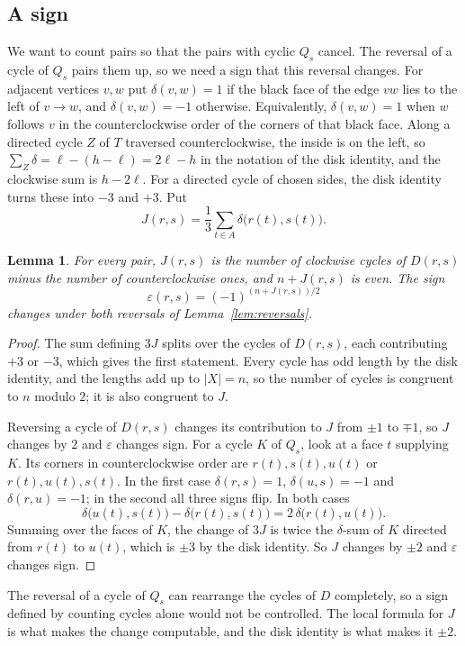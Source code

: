 \documentclass[10pt]{amsart}
\numberwithin{equation}{section}
\newtheorem{lemma}[equation]{Lemma}
\theoremstyle{definition}
\theoremstyle{remark}
\newcommand{\T}{T}
\newcommand{\eps}{\varepsilon}
\newcommand{\Dc}{D}
\begin{document}
\subsection*{A sign}
We want to count pairs so that the pairs with cyclic $Q_s$ cancel.
The reversal of a cycle of $Q_s$ pairs them up, so we need a sign that this reversal changes.
For adjacent vertices $v,w$ put $\delta(v,w)=1$ if the black face of the edge $vw$ lies to the left of $v\to w$, and $\delta(v,w)=-1$ otherwise.
Equivalently, $\delta(v,w)=1$ when $w$ follows $v$ in the counterclockwise order of the corners of that black face.
Along a directed cycle $Z$ of $\T$ traversed counterclockwise, the inside is on the left, so $\sum_{Z}\delta=\ell-(h-\ell)=2\ell-h$ in the notation of the disk identity, and the clockwise sum is $h-2\ell$.
For a directed cycle of chosen sides, the disk identity turns these into $-3$ and $+3$.
Put
\[
J(r,s)=\frac13\sum_{t\in A}\delta\bigl(r(t),s(t)\bigr).
\]

\begin{lemma}\label{lem:sign}
For every pair, $J(r,s)$ is the number of clockwise cycles of $\Dc(r,s)$ minus the number of counterclockwise ones, and $n+J(r,s)$ is even.
The sign
\[
\eps(r,s)=(-1)^{(n+J(r,s))/2}
\]
changes under both reversals of Lemma~\ref{lem:reversals}.
\end{lemma}

\begin{proof}
The sum defining $3J$ splits over the cycles of $\Dc(r,s)$, each contributing $+3$ or $-3$, which gives the first statement.
Every cycle has odd length by the disk identity, and the lengths add up to $|X|=n$, so the number of cycles is congruent to $n$ modulo $2$; it is also congruent to $J$.

Reversing a cycle of $\Dc(r,s)$ changes its contribution to $J$ from $\pm1$ to $\mp1$, so $J$ changes by $2$ and $\eps$ changes sign.
For a cycle $K$ of $Q_s$, look at a face $t$ supplying $K$.
Its corners in counterclockwise order are $r(t),s(t),u(t)$ or $r(t),u(t),s(t)$.
In the first case $\delta(r,s)=1$, $\delta(u,s)=-1$ and $\delta(r,u)=-1$; in the second all three signs flip.
In both cases
\[
\delta\bigl(u(t),s(t)\bigr)-\delta\bigl(r(t),s(t)\bigr)=2\,\delta\bigl(r(t),u(t)\bigr).
\]
Summing over the faces of $K$, the change of $3J$ is twice the $\delta$-sum of $K$ directed from $r(t)$ to $u(t)$, which is $\pm3$ by the disk identity.
So $J$ changes by $\pm2$ and $\eps$ changes sign.
\end{proof}

The reversal of a cycle of $Q_s$ can rearrange the cycles of $\Dc$ completely, so a sign defined by counting cycles alone would not be controlled.
The local formula for $J$ is what makes the change computable, and the disk identity is what makes it $\pm2$.
\end{document}
